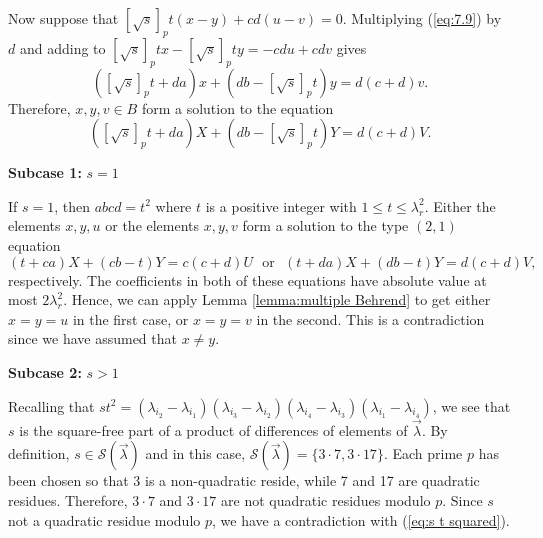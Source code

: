 \documentclass[12pt]{article}%
\newcommand{\coeff}[2]{( \lambda_{i_#1} - \lambda_{i_#2} ) }
\begin{document}
Now suppose that $ [ \sqrt{s} ]_p t (x - y ) + cd ( u - v)  = 0$.  Multiplying (\ref{eq:7.9}) by $d$ and adding to $[ \sqrt{s} ]_p tx - [ \sqrt{s} ]_p ty = -cdu + cdv$ gives
\[
( [ \sqrt{s} ]_p t  + da ) x + ( db - [ \sqrt{s} ]_p t )y  = d(c+d)v.
\]
Therefore, $x,y,v \in B$ form a solution to the equation 
\begin{equation}\label{eq:bad 2}
( [ \sqrt{s} ]_p t  + da ) X + ( db - [ \sqrt{s} ]_p t )Y  = d(c+d)V.
\end{equation}

\bigskip
\noindent
\textbf{Subcase 1:} $s = 1$

\medskip
  If $s = 1$, then $abcd = t^2$ where $t$ is a positive integer with $1 \leq t \leq \lambda_r^2$.  Either the elements $x,y,u$ or the elements $x,y,v$ form a solution to the 
 type $(2,1)$ equation 
 \[ (t + ca ) X + ( cb - t)Y = c ( c + d)  U ~~~ \mbox{or} ~~~ 
(  t  + da ) X + ( db - t )Y  = d(c+d)V,
 \]
respectively.  The coefficients in both of these equations have absolute value at most $2 \lambda_r^2$.  Hence, we can apply Lemma \ref{lemma:multiple Behrend} to get either $x = y = u$ in the first case, or $x=y=v$ in the second.  This is a contradiction since we have assumed that $x \neq y$.       
 
\bigskip
\noindent
\textbf{Subcase 2:} $s > 1$

\medskip

Recalling that $st^2 = \coeff{2}{1} \coeff{3}{2} \coeff{4}{3} \coeff{1}{4}$, we see
that $s$ is the square-free part of a product of differences of elements of $\vec{ \lambda}$.  
By definition, $s \in \mathcal{S} ( \vec{ \lambda})$ and in this case, 
$\mathcal{S} ( \vec{ \lambda}) = \{ 3 \cdot 7 , 3 \cdot 17 \}$.  
Each prime $p$ has been chosen so that 3 is a non-quadratic reside, while 7 and 17 are quadratic residues.  Therefore, $3 \cdot 7$ and $ 3 \cdot 17$ are not quadratic residues modulo $p$. 
Since $s$ not a quadratic residue modulo $p$, we have a contradiction with 
(\ref{eq:s t squared}).   

 
 
\end{document}
